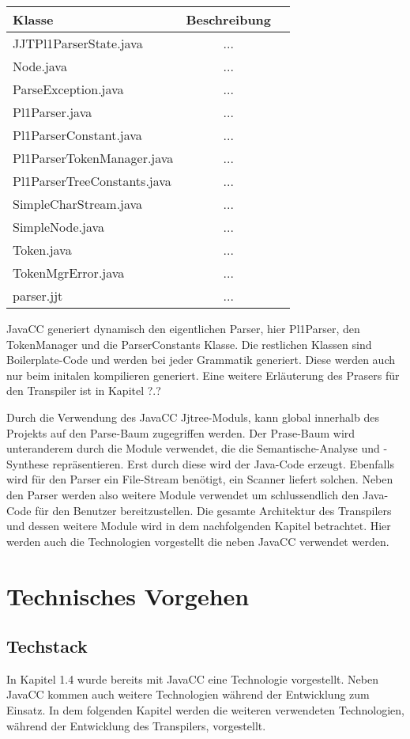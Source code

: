 \begin{tabular}[h]{l|c|r}
Klasse & Beschreibung \\
\hline
JJTPl1ParserState.java & ... \\
Node.java & ... \\
ParseException.java & ... \\
Pl1Parser.java & ... \\
Pl1ParserConstant.java & ... \\
Pl1ParserTokenManager.java & ... \\
Pl1ParserTreeConstants.java & ... \\
SimpleCharStream.java & ... \\
SimpleNode.java & ... \\
Token.java & ... \\
TokenMgrError.java & ... \\
parser.jjt & ... \\
\end{tabular}


JavaCC generiert dynamisch den eigentlichen Parser, hier Pl1Parser, den TokenManager und die ParserConstants Klasse. Die restlichen Klassen sind Boilerplate-Code und werden bei jeder Grammatik generiert. Diese werden auch nur beim initalen kompilieren generiert. Eine weitere Erläuterung des Prasers für den Transpiler ist in Kapitel ?.?

Durch die Verwendung des JavaCC Jjtree-Moduls, kann global innerhalb des Projekts auf den Parse-Baum zugegriffen werden. 
Der Prase-Baum wird unteranderem durch die Module verwendet, die die Semantische-Analyse und -Synthese repräsentieren.
Erst durch diese wird der Java-Code erzeugt.
Ebenfalls wird für den Parser ein File-Stream benötigt, ein Scanner liefert solchen.
Neben den Parser werden also weitere Module verwendet um schlussendlich den Java-Code für den Benutzer bereitzustellen.
Die gesamte Architektur des Transpilers und dessen weitere Module wird in dem nachfolgenden Kapitel betrachtet. 
Hier werden auch die Technologien vorgestellt die neben JavaCC verwendet werden. 

\section{Technisches Vorgehen}
\subsection{Techstack}
In Kapitel 1.4 wurde bereits mit JavaCC eine Technologie vorgestellt. Neben JavaCC kommen auch weitere Technologien während der Entwicklung zum Einsatz. In dem folgenden Kapitel werden die weiteren verwendeten Technologien, während der Entwicklung des Transpilers, vorgestellt.

